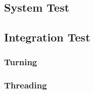 \subsection{System Test}

\subsection{Integration Test}
\subsubsection{Turning}
\subsubsection{Threading}













